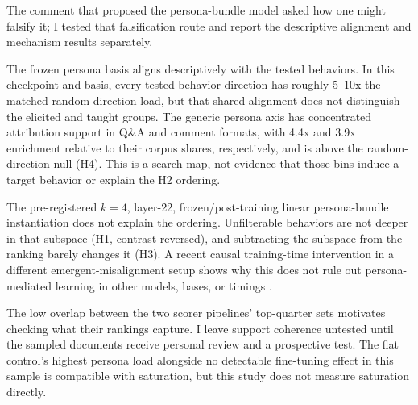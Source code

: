 The comment that proposed the persona-bundle model asked how one might
falsify it; I tested that falsification route and report the descriptive
alignment and mechanism results separately.

The frozen persona basis aligns descriptively with the tested behaviors. In
this checkpoint and basis, every tested behavior direction has roughly
5--10x the matched random-direction load, but that shared alignment does
not distinguish the elicited and taught groups. The generic persona axis
has concentrated attribution support in Q\&A and comment formats, with 4.4x
and 3.9x enrichment relative to their corpus shares, respectively, and is
above the random-direction null (H4). This is a search map, not evidence
that those bins induce a target behavior or explain the H2 ordering.

The pre-registered $k=4$, layer-22, frozen/post-training linear
persona-bundle instantiation does not explain the ordering. Unfilterable
behaviors are not deeper
in that subspace (H1, contrast reversed), and subtracting the subspace from
the ranking barely changes it (H3). A recent causal training-time
intervention in a different emergent-misalignment setup shows why this does
not rule out persona-mediated learning in other models, bases, or timings
\citep{nadaf2026persona}.

The low overlap between the two  scorer pipelines'
top-quarter sets motivates checking what their rankings capture. I leave
support coherence untested until the sampled documents receive personal
review and a prospective test. The flat control's highest persona load
alongside no detectable fine-tuning effect in this sample is compatible
with saturation, but this study does not measure saturation directly.
